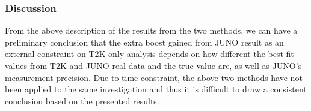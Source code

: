 \subsubsection{Discussion}
From the above description of the results from the two methods, we can have a preliminary conclusion that the extra boost gained from JUNO result as an external constraint on T2K-only analysis depends on how different the best-fit values from T2K and JUNO real data and the true value are, as well as JUNO's measurement precision. Due to time constraint, the above two methods have not been applied to the same investigation and thus it is difficult to draw a consistent conclusion based on the presented results.


